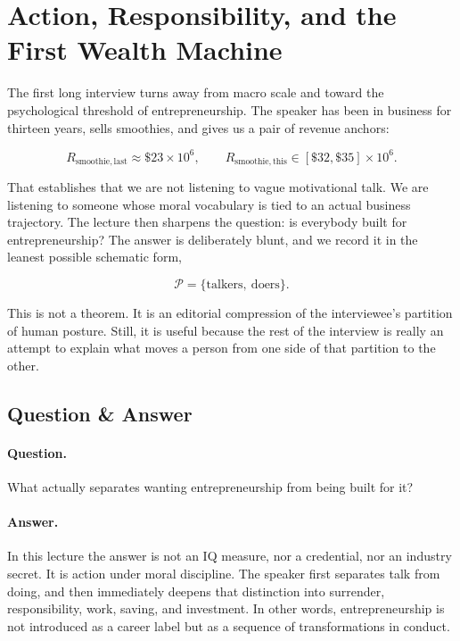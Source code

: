 \section{Action, Responsibility, and the First Wealth Machine}

The first long interview turns away from macro scale and toward the psychological threshold of entrepreneurship. The speaker has been in business for thirteen years, sells smoothies, and gives us a pair of revenue anchors:

\begin{equation}
R_{\mathrm{smoothie,last}} \approx \$23\times 10^{6},
\qquad
R_{\mathrm{smoothie,this}} \in [\$32,\$35]\times 10^{6}.
\end{equation}

That establishes that we are not listening to vague motivational talk. We are listening to someone whose moral vocabulary is tied to an actual business trajectory. The lecture then sharpens the question: is everybody built for entrepreneurship? The answer is deliberately blunt, and we record it in the leanest possible schematic form,

\begin{equation}
\mathcal{P}=\{\text{talkers},\ \text{doers}\}.
\end{equation}

This is not a theorem. It is an editorial compression of the interviewee's partition of human posture. Still, it is useful because the rest of the interview is really an attempt to explain what moves a person from one side of that partition to the other.

\subsection{Question \& Answer}

\paragraph{Question.} What actually separates wanting entrepreneurship from being built for it?

\paragraph{Answer.} In this lecture the answer is not an IQ measure, nor a credential, nor an industry secret. It is action under moral discipline. The speaker first separates talk from doing, and then immediately deepens that distinction into surrender, responsibility, work, saving, and investment. In other words, entrepreneurship is not introduced as a career label but as a sequence of transformations in conduct.

